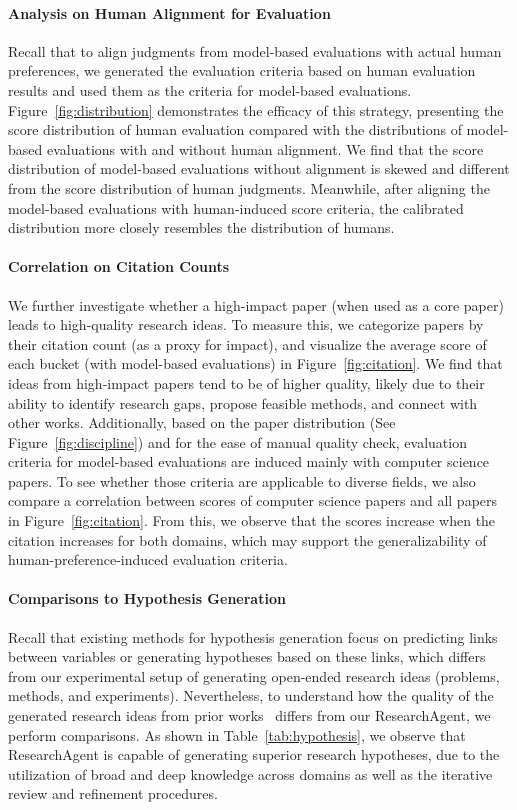 \paragraph{Analysis on Human Alignment for Evaluation}
Recall that to align judgments from model-based evaluations with actual human preferences, we generated the evaluation criteria based on human evaluation results and used them as the criteria for model-based evaluations. Figure~\ref{fig:distribution} demonstrates the efficacy of this strategy, presenting the score distribution of human evaluation compared with the distributions of model-based evaluations with and without human alignment. We find that the score distribution of model-based evaluations without alignment is skewed and different from the score distribution of human judgments. Meanwhile, after aligning the model-based evaluations with human-induced score criteria, the calibrated distribution more closely resembles the distribution of humans.

\paragraph{Correlation on Citation Counts}
We further investigate whether a high-impact paper (when used as a core paper) leads to high-quality research ideas. To measure this, we categorize papers by their citation count (as a proxy for impact), and visualize the average score of each bucket (with model-based evaluations) in Figure~\ref{fig:citation}. We find that ideas from high-impact papers tend to be of higher quality, likely due to their ability to identify research gaps, propose feasible methods, and connect with other works. Additionally, based on the paper distribution (See Figure~\ref{fig:discipline}) and for the ease of manual quality check, evaluation criteria for model-based evaluations are induced mainly with computer science papers. To see whether those criteria are applicable to diverse fields, we also compare a correlation between scores of computer science papers and all papers in Figure~\ref{fig:citation}. From this, we observe that the scores increase when the citation increases for both domains, which may support the generalizability of human-preference-induced evaluation criteria.



\paragraph{Comparisons to Hypothesis Generation}
Recall that existing methods for hypothesis generation focus on predicting links between variables or generating hypotheses based on these links, which differs from our experimental setup of generating open-ended research ideas (problems, methods, and experiments). Nevertheless, to understand how the quality of the generated research ideas from prior works~\cite{CLBD, tomato} differs from our ResearchAgent, we perform comparisons. As shown in Table~\ref{tab:hypothesis}, we observe that ResearchAgent is capable of generating superior research hypotheses, due to the utilization of broad and deep knowledge across domains as well as the iterative review and refinement procedures.

